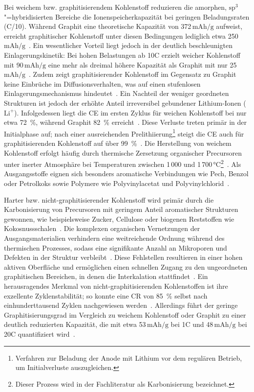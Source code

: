 Bei weichem bzw. graphitisierendem Kohlenstoff reduzieren die amorphen, $\text{sp}^3$"=hybridisierten Bereiche die Ionenspeicherkapazität bei geringen Beladungsraten (C/10). Während Graphit eine theoretische Kapazität von 372\,$\si{\mA\hour\per\g}$ aufweist, erreicht graphitischer Kohlenstoff unter diesen Bedingungen lediglich etwa 250\,$\si{\mA\hour\per\g}$~\cite{Schroeder2014}. Ein wesentlicher Vorteil liegt jedoch in der deutlich beschleunigten Einlagerungskinetik: Bei hohen Belastungen ab 10C erzielt weicher Kohlenstoff mit 90\,$\si{\mA\hour\per\g}$ eine mehr als dreimal höhere Kapazität als Graphit mit nur 25\,$\si{\mA\hour\per\g}$~\cite{Schroeder2014}. Zudem zeigt graphitisierender Kohlenstoff im Gegensatz zu Graphit keine Einbrüche im Diffusionsverhalten, was auf einen stufenlosen Einlagerungsmechanismus hindeutet~\cite{Huajun2007}. Ein Nachteil der weniger geordneten Strukturen ist jedoch der erhöhte Anteil irreversibel gebundener Lithium-Ionen ($\text{Li}^+$). Infolgedessen liegt die CE im ersten Zyklus für weichen Kohlenstoff bei nur etwa 72~\%, während Graphit 82~\% erreicht~\cite{Schroeder2014}. Diese Verluste treten primär in der Initialphase auf; nach einer ausreichenden Prelithiierung\footnote{Verfahren zur Beladung der Anode mit Lithium vor dem regulären Betrieb, um Initialverluste auszugleichen.} steigt die CE auch für graphitisierenden Kohlenstoff auf über 99~\%~\cite{Schroeder2014}. Die Herstellung von weichem Kohlenstoff erfolgt häufig durch thermische Zersetzung organischer Precursoren unter inerter Atmosphäre bei Temperaturen zwischen 1\,000 und 1\,700\,$\si{\degreeCelsius}$\footnote{Dieser Prozess wird in der Fachliteratur als Karbonisierung bezeichnet.}~\cite{Ghosh2024,Kim2017a}. Als Ausgangsstoffe eignen sich besonders aromatische Verbindungen wie Pech, Benzol oder Petrolkoks sowie Polymere wie Polyvinylacetat und Polyvinylchlorid~\cite{Wang2021}.

Harter bzw. nicht-graphitisierender Kohlenstoff wird primär durch die Karbonisierung von Precursoren mit geringem Anteil aromatischer Strukturen gewonnen, wie beispielsweise Zucker, Cellulose oder biogenen Reststoffen wie Kokosnussschalen~\cite{Wang2021}. Die komplexen organischen Vernetzungen der Ausgangsmaterialien verhindern eine weitreichende Ordnung während des thermischen Prozesses, sodass eine signifikante Anzahl an Mikroporen und Defekten in der Struktur verbleibt~\cite{Liu2019a}. Diese Fehlstellen resultieren in einer hohen aktiven Oberfläche und ermöglichen einen schnellen Zugang zu den ungeordneten graphitischen Bereichen, in denen die Interkalation stattfindet~\cite{Fujimoto2010}.
Ein herausragendes Merkmal von nicht-graphitisierenden Kohlenstoffen ist ihre exzellente Zyklenstabilität; so konnte eine CR von 85~\% selbst nach einhunderttausend Zyklen nachgewiesen werden~\cite{Cao2014}. Allerdings führt der geringe Graphitisierungsgrad im Vergleich zu weichem Kohlenstoff oder Graphit zu einer deutlich reduzierten Kapazität, die mit etwa 53\,$\si{\mA\hour\per\g}$ bei 1C und 48\,$\si{\mA\hour\per\g}$ bei 20C quantifiziert wird~\cite{Sun2017}.

